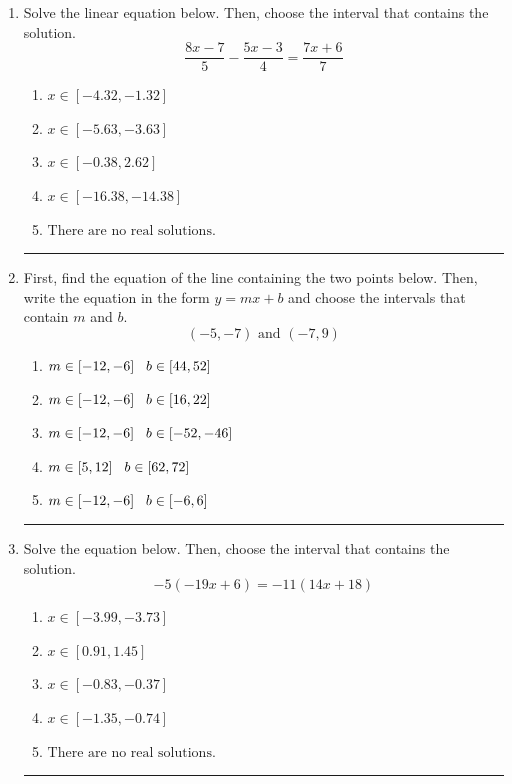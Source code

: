 \documentclass[14pt]{extbook}
\newcommand{\litem}[1]{\item#1\hspace*{-1cm}\rule{\textwidth}{0.4pt}}
\begin{document}
\begin{enumerate}
{\begin{enumerate}[label=\Alph*.]
\end{enumerate} }
\litem{
Solve the linear equation below. Then, choose the interval that contains the solution.\[ \frac{8x -7}{5} - \frac{5x -3}{4} = \frac{7x + 6}{7} \]\begin{enumerate}[label=\Alph*.]
\item \( x \in [-4.32, -1.32] \)
\item \( x \in [-5.63, -3.63] \)
\item \( x \in [-0.38, 2.62] \)
\item \( x \in [-16.38, -14.38] \)
\item \( \text{There are no real solutions.} \)

\end{enumerate} }
\litem{
First, find the equation of the line containing the two points below. Then, write the equation in the form $ y=mx+b $ and choose the intervals that contain $m$ and $b$.\[ (-5, -7) \text{ and } (-7, 9) \]\begin{enumerate}[label=\Alph*.]
\item \( m \in [-12, -6] \hspace*{3mm} b \in [44, 52] \)
\item \( m \in [-12, -6] \hspace*{3mm} b \in [16, 22] \)
\item \( m \in [-12, -6] \hspace*{3mm} b \in [-52, -46] \)
\item \( m \in [5, 12] \hspace*{3mm} b \in [62, 72] \)
\item \( m \in [-12, -6] \hspace*{3mm} b \in [-6, 6] \)

\end{enumerate} }
\litem{
Solve the equation below. Then, choose the interval that contains the solution.\[ -5(-19x + 6) = -11(14x + 18) \]\begin{enumerate}[label=\Alph*.]
\item \( x \in [-3.99, -3.73] \)
\item \( x \in [0.91, 1.45] \)
\item \( x \in [-0.83, -0.37] \)
\item \( x \in [-1.35, -0.74] \)
\item \( \text{There are no real solutions.} \)


\end{enumerate}}
\end{enumerate}
\end{document}
